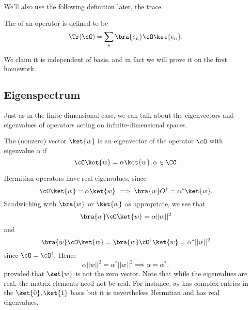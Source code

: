 We'll also use the following definition later, the trace.
\begin{defn}
    The  of an operator is defined to be
    \begin{equation}
        \Tr(\cO)=\sum_n \bra{e_n}\cO \ket{e_n}.
    \end{equation}
\end{defn}
We claim it is independent of basis, and in fact we will prove it on the first homework.

\subsection*{Eigenspectrum}
Just as in the finite-dimensional case, we can talk about the eigenvectors and eigenvalues of operators acting on infinite-dimensional spaces.
\begin{defn}
    The (nonzero) vector $\ket{w}$ is an eigenvector of the operator $\cO$ with eigenvalue $\alpha$ if
    \begin{equation}
        \cO\ket{w}=\alpha \ket{w}, \alpha \in \CC.
    \end{equation}
\end{defn}
Hermitian operators have real eigenvalues, since
\begin{equation}
    \cO\ket{w} =\alpha\ket{w} \implies \bra{w} O^\dagger = \alpha^* \ket{w}.
\end{equation}
Sandwiching with $\bra{w}$ or $\ket{w}$ as appropriate, we see that
\begin{equation}
    \bra{w}\cO \ket{w}= \alpha||w||^2
\end{equation}
and
\begin{equation}
    \bra{w}\cO\ket{w} = \bra{w}\cO^\dagger \ket{w} = \alpha^* ||w||^2
\end{equation}
since $\cO=\cO^\dagger.$ Hence
\begin{equation}
    \alpha||w||^2 = \alpha^* ||w||^2 \implies \alpha = \alpha^*,
\end{equation}
provided that $\ket{w}$ is not the zero vector. Note that while the eigenvalues are real, the matrix elements need not be real. For instance, $\sigma_2$ has complex entries in the $\ket{0},\ket{1}$ basis but it is nevertheless Hermitian and has real eigenvalues.

